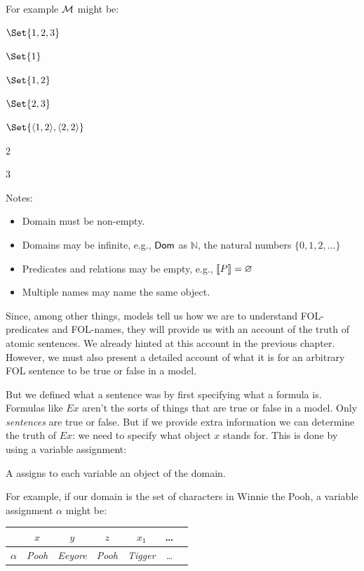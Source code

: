 For example ${\mathcal{M}}$ might be:
\begin{interp}
	\item[\domain] $\Set{1,2,3}$
	\item[\denote{H}] $\Set{1}$
	\item[\denote{S}] $\Set{1,2}$
	\item[\denote{C}] $\Set{2,3}$
	\item[\denote{A}] $\Set{\sequence{1,2},\sequence{2,2}}$
	\item[\denote{a}] $2$
	\item[\denote{b}] $3$
\end{interp}

Notes:\begin{itemize}
	\item Domain must be non-empty.
	\item Domains may be infinite, e.g., $\mathsf{Dom}$ as $\mathbb{N}$, the natural numbers $\{0,1,2,\ldots\}$
	\item Predicates and relations may be empty, e.g., $\llbracket P\rrbracket=\varnothing$
	\item Multiple names may name the same object. 
\end{itemize}


Since, among other things, models tell us how we are to understand FOL-predicates and FOL-names, they will provide us with an account of the truth of atomic sentences. We already hinted at this account in the previous chapter. However, we must also present a detailed account of what it is for an arbitrary FOL sentence to be true or false in a model.

But we defined what a sentence was by first specifying what a formula is. Formulas like $Ex$ aren't the sorts of things that are true or false in a model. Only \emph{sentences} are true or false. But if we provide extra information we can determine the truth of $Ex$: we need to specify what object $x$ stands for. This is done by using a variable assignment: 


\begin{definition}A  assigns to each variable an object of the domain.\end{definition}

For example, if our domain is the set of characters in Winnie the Pooh, a variable assignment $\alpha$ might be:
\begin{center}
	\begin{tabular}{r@{\,:\quad}cccccc}
		\omit & $x$ & $y$ & $z$ & $x_1$ & \ldots \\ \hline
		$\alpha$ & \emph{Pooh} & \emph{Eeyore} & \emph{Pooh} & \emph{Tigger} & \ldots
	\end{tabular}
\end{center}



